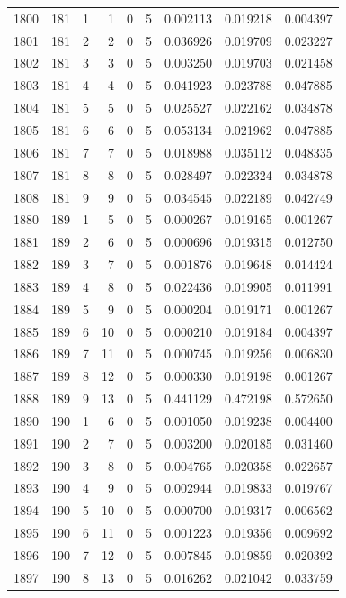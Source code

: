 \begin{longtable}{rrrrrrrrr}
1800 & 181 & 1 & 1 & 0 & 5 & 0.002113 & 0.019218 & 0.004397 \\
1801 & 181 & 2 & 2 & 0 & 5 & 0.036926 & 0.019709 & 0.023227 \\
1802 & 181 & 3 & 3 & 0 & 5 & 0.003250 & 0.019703 & 0.021458 \\
1803 & 181 & 4 & 4 & 0 & 5 & 0.041923 & 0.023788 & 0.047885 \\
1804 & 181 & 5 & 5 & 0 & 5 & 0.025527 & 0.022162 & 0.034878 \\
1805 & 181 & 6 & 6 & 0 & 5 & 0.053134 & 0.021962 & 0.047885 \\
1806 & 181 & 7 & 7 & 0 & 5 & 0.018988 & 0.035112 & 0.048335 \\
1807 & 181 & 8 & 8 & 0 & 5 & 0.028497 & 0.022324 & 0.034878 \\
1808 & 181 & 9 & 9 & 0 & 5 & 0.034545 & 0.022189 & 0.042749 \\
1880 & 189 & 1 & 5 & 0 & 5 & 0.000267 & 0.019165 & 0.001267 \\
1881 & 189 & 2 & 6 & 0 & 5 & 0.000696 & 0.019315 & 0.012750 \\
1882 & 189 & 3 & 7 & 0 & 5 & 0.001876 & 0.019648 & 0.014424 \\
1883 & 189 & 4 & 8 & 0 & 5 & 0.022436 & 0.019905 & 0.011991 \\
1884 & 189 & 5 & 9 & 0 & 5 & 0.000204 & 0.019171 & 0.001267 \\
1885 & 189 & 6 & 10 & 0 & 5 & 0.000210 & 0.019184 & 0.004397 \\
1886 & 189 & 7 & 11 & 0 & 5 & 0.000745 & 0.019256 & 0.006830 \\
1887 & 189 & 8 & 12 & 0 & 5 & 0.000330 & 0.019198 & 0.001267 \\
1888 & 189 & 9 & 13 & 0 & 5 & 0.441129 & 0.472198 & 0.572650 \\
1890 & 190 & 1 & 6 & 0 & 5 & 0.001050 & 0.019238 & 0.004400 \\
1891 & 190 & 2 & 7 & 0 & 5 & 0.003200 & 0.020185 & 0.031460 \\
1892 & 190 & 3 & 8 & 0 & 5 & 0.004765 & 0.020358 & 0.022657 \\
1893 & 190 & 4 & 9 & 0 & 5 & 0.002944 & 0.019833 & 0.019767 \\
1894 & 190 & 5 & 10 & 0 & 5 & 0.000700 & 0.019317 & 0.006562 \\
1895 & 190 & 6 & 11 & 0 & 5 & 0.001223 & 0.019356 & 0.009692 \\
1896 & 190 & 7 & 12 & 0 & 5 & 0.007845 & 0.019859 & 0.020392 \\
1897 & 190 & 8 & 13 & 0 & 5 & 0.016262 & 0.021042 & 0.033759 \\

\end{longtable}
